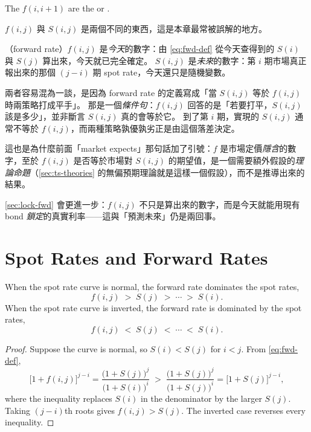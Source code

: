 The $f(i,i+1)$ are the  or .

\suppstart
\begin{remark}
	$f(i,j)$ 與 $S(i,j)$ 是兩個不同的東西，這是本章最常被誤解的地方。

	（forward rate）$f(i,j)$ 是\emph{今天}的數字：由 \eqref{eq:fwd-def} 從今天查得到的 $S(i)$ 與 $S(j)$ 算出來，今天就已完全確定。
	$S(i,j)$ 是\emph{未來}的數字：第 $i$ 期市場真正報出來的那個 $(j-i)$ 期 spot rate，今天還只是隨機變數。

	兩者容易混為一談，是因為 forward rate 的定義寫成「當 $S(i,j)$ 等於 $f(i,j)$ 時兩策略打成平手」。
	那是一個\emph{條件句}：$f(i,j)$ 回答的是「若要打平，$S(i,j)$ 該是多少」，並非斷言 $S(i,j)$ 真的會等於它。
	到了第 $i$ 期，實現的 $S(i,j)$ 通常不等於 $f(i,j)$，而兩種策略孰優孰劣正是由這個落差決定。

	這也是為什麼前面「market expects」那句話加了引號：$f$ 是市場定價\emph{隱含}的數字，至於 $f(i,j)$ 是否等於市場對 $S(i,j)$ 的期望值，是一個需要額外假設的\emph{理論命題}（\autoref{sec:ts-theories} 的無偏預期理論就是這樣一個假設），而不是推導出來的結果。

	\autoref{sec:lock-fwd} 會更進一步：$f(i,j)$ 不只是算出來的數字，而是今天就能用現有 bond \emph{鎖定}的真實利率——這與「預測未來」仍是兩回事。
\end{remark}
\suppend

\section{Spot Rates and Forward Rates}
\label{sec:fwd-vs-spot}


\begin{proposition}
	\label{prop:fwd-dominates}
	When the spot rate curve is normal, the forward rate dominates the spot rates,
	\[
		f(i,j) \;>\; S(j) \;>\; \cdots \;>\; S(i) .
	\]
	When the spot rate curve is inverted, the forward rate is dominated by the spot rates,
	\[
		f(i,j) \;<\; S(j) \;<\; \cdots \;<\; S(i) .
	\]
\end{proposition}

\suppstart
\begin{proof}
	Suppose the curve is normal, so $S(i)<S(j)$ for $i<j$. From \eqref{eq:fwd-def},
	\[
		\bigl[1+f(i,j)\bigr]^{j-i}
		= \frac{\bigl(1+S(j)\bigr)^{j}}{\bigl(1+S(i)\bigr)^{i}}
		\;>\; \frac{\bigl(1+S(j)\bigr)^{j}}{\bigl(1+S(j)\bigr)^{i}}
		= \bigl[1+S(j)\bigr]^{j-i} ,
	\]
	where the inequality replaces $S(i)$ in the denominator by the larger $S(j)$.
	Taking $(j-i)$th roots gives $f(i,j)>S(j)$.
	The inverted case reverses every inequality.
\end{proof}

